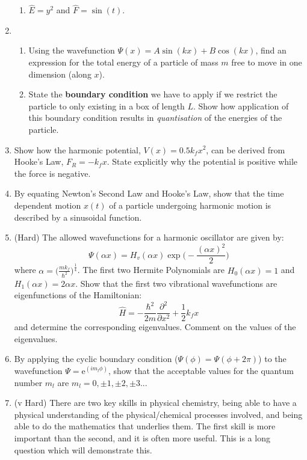 \documentclass{memoir}[11pt,oneside,a4paper,openany]
\begin{document}
\begin{enumerate}
\begin{enumerate}
		\item $\hat{E} = y^2$ and $\hat{F} = \sin(t)$.
	\end{enumerate}
\item 
	\begin{enumerate} 
		\item Using the wavefunction $\Psi(x) = A\sin(kx)+B\cos(kx)$, find an expression for the total energy of a particle of mass $m$ free to move in one dimension (along $x$).
		\item State the \textbf{boundary condition} we have to apply if we restrict the particle to only existing in a box of length $L$. Show how application of this boundary condition results in \emph{quantisation} of the energies of the particle.
	\end{enumerate}
\item Show how the harmonic potential, $V(x) = 0.5k_fx^2$, can be derived from Hooke's Law, $F_R = -k_fx$. State explicitly why the potential is positive while the force is negative. 

\item By equating Newton's Second Law and Hooke's Law, show that the time dependent motion $x(t)$ of a particle undergoing harmonic motion is described by a sinusoidal function. 

\item (Hard) The allowed wavefunctions for a harmonic oscillator are given by: \begin{equation} \Psi(\alpha x) = H_v(\alpha x)\exp{\bigg(-\frac{(\alpha x)^2}{2}\bigg)} \end{equation} where $\alpha = \bigg(\frac{mk_f}{\hbar^2}\bigg)^{\frac{1}{4}}$. The first two Hermite Polynomials are $H_0(\alpha x) = 1$ and $H_1(\alpha x) = 2\alpha x$. Show that the first two vibrational wavefunctions are eigenfunctions of the Hamiltonian: \begin{equation} \hat{H} = -\frac{\hbar^2}{2m}\frac{\partial^2}{\partial x^2} + \frac{1}{2}k_f x \end{equation} and determine the corresponding eigenvalues. Comment on the values of the eigenvalues. 
	
\item By applying the cyclic boundary condition ($\Psi(\phi) = \Psi(\phi+2\pi)$) to the wavefunction $\Psi = \mathrm{e}^{(im_l\phi)}$, show that the acceptable values for the quantum number $m_l$ are $m_l = 0, \pm1, \pm2, \pm3..$.

\item (v Hard) There are two key skills in physical chemistry, being able to have a physical understanding of the physical/chemical processes involved, and being able to do the mathematics that underlies them. The first skill is more important than the second, and it is often more useful. This is a long question which will demonstrate this. 


\end{enumerate}
\end{document}
